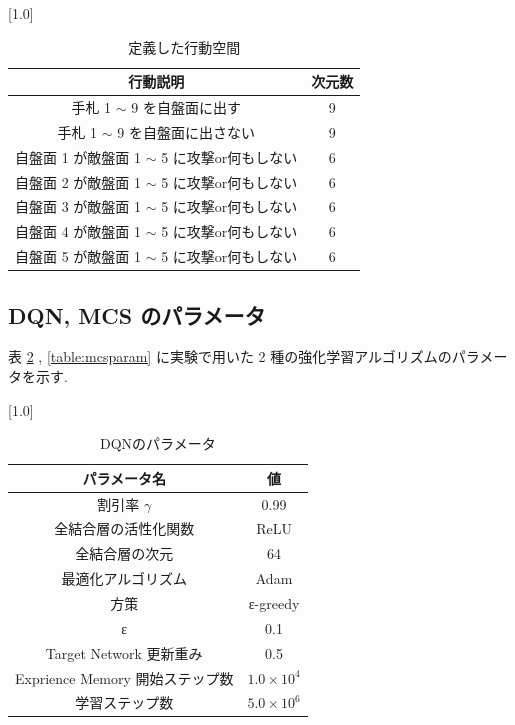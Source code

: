 \documentclass[twocolumn]{jarticle}
\begin{document}
  \begin{table}[t]
    \centering
    \caption{定義した行動空間}
    \vspace{-0.3cm}
    \label{table:action}
    \scalebox{1.0}[1.0]{
      \begin{tabular}{|c|c|}
        \hline
        行動説明                          & 次元数        \\ \hline \hline
        手札 1 $\sim$ 9 を自盤面に出す             & 9          \\ \hline
        手札 1 $\sim$ 9 を自盤面に出さない & 9 \\ \hline
        自盤面 1 が敵盤面 1 $\sim$ 5 に攻撃or何もしない    & 6          \\ \hline
        自盤面 2 が敵盤面 1 $\sim$ 5 に攻撃or何もしない    & 6          \\ \hline
        自盤面 3 が敵盤面 1 $\sim$ 5 に攻撃or何もしない    & 6          \\ \hline
        自盤面 4 が敵盤面 1 $\sim$ 5 に攻撃or何もしない    & 6          \\ \hline
        自盤面 5 が敵盤面 1 $\sim$ 5 に攻撃or何もしない    & 6          \\ \hline
        \end{tabular}
    }
    \end{table}
  
  \subsection{DQN, MCS のパラメータ}
  表 \ref{table:dqnparam} , \ref{table:mcsparam} に実験で用いた 2 種の強化学習アルゴリズムのパラメータを示す.
  \begin{table}[t]
    \centering
    \caption{DQNのパラメータ}
    \vspace{-0.3cm}
    \label{table:dqnparam}
    \scalebox{1.0}[1.0]{
      \begin{tabular}{|c|c|}
        \hline
        パラメータ名 & 値 \\ \hline \hline
        割引率 $\gamma$ & 0.99 \\ \hline     
        全結合層の活性化関数             & ReLU     \\ \hline
        全結合層の次元                & 64       \\ \hline
        最適化アルゴリズム              & Adam     \\ \hline
        方策                 & ε-greedy \\ \hline
        ε & 0.1 \\ \hline  
        Target Network 更新重み              & 0.5     \\ \hline
        Exprience Memory 開始ステップ数 & $1.0 \times 10^4$ \\ \hline
        学習ステップ数 &  $5.0 \times 10^6$ \\ \hline
        \end{tabular}
    }
    \end{table}
  
\end{document}
